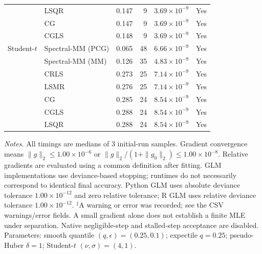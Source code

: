 \documentclass[10pt,a4paper]{article}
\begin{document}
\begin{longtable}{llrrrc}
 & LSQR & 0.147 & 9 & $3.69\times10^{-9}$ & Yes \\
 & CG & 0.147 & 9 & $3.69\times10^{-9}$ & Yes \\
 & CGLS & 0.148 & 9 & $3.69\times10^{-9}$ & Yes \\
\midrule
Student-$t$ & Spectral-MM (PCG) & 0.065 & 48 & $6.66\times10^{-9}$ & Yes \\
 & Spectral-MM (MM) & 0.126 & 35 & $4.83\times10^{-9}$ & Yes \\
 & CRLS & 0.273 & 25 & $7.14\times10^{-9}$ & Yes \\
 & LSMR & 0.276 & 25 & $7.14\times10^{-9}$ & Yes \\
 & CG & 0.285 & 24 & $8.54\times10^{-9}$ & Yes \\
 & CGLS & 0.288 & 24 & $8.54\times10^{-9}$ & Yes \\
 & LSQR & 0.288 & 24 & $8.54\times10^{-9}$ & Yes \\
\end{longtable}
\noindent\textit{Notes.} All timings are medians of 3 initial-run samples.
Gradient convergence means $\|g\|_2\leq 1.00\times10^{-6}$ or $\|g\|_2/(1+\|g_0\|_2)\leq 1.00\times10^{-8}$.
Relative gradients are evaluated using a common definition after fitting. GLM implementations use deviance-based stopping; runtimes do not necessarily correspond to identical final accuracy.
Python GLM uses absolute deviance tolerance $1.00\times10^{-12}$ and zero relative tolerance; R GLM uses relative deviance tolerance $1.00\times10^{-12}$.
$^{\ddagger}$A warning or error was recorded; see the CSV warnings/error fields. A small gradient alone does not establish a finite MLE under separation.
Native negligible-step and stalled-step acceptance are disabled.
Parameters: smooth quantile $(q,\epsilon)=(0.25,0.1)$; expectile $q=0.25$; pseudo-Huber $\delta=1$; Student-$t$ $(\nu,\sigma)=(4,1)$.
\par
\endgroup
\end{document}
